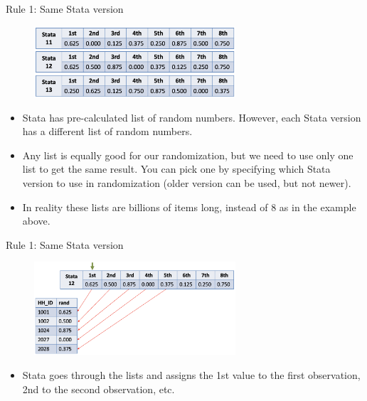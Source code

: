 \documentclass[aspectratio=169]{beamer}
\begin{document}
\begin{frame}[fragile]{Rule 1: Same Stata version}
	
	\begin{figure}
		\centering
		\includegraphics[width=75mm]{img/Randomization4}
	\end{figure}
	
	\begin{itemize}[<default overlay specification>]	
		\item<1>  Stata has pre-calculated list of random numbers. However, each Stata version has a different list of random numbers. 
		\item<1> Any list is equally good for our randomization, but we need to use only one list to get the same result. You can pick one by specifying which Stata version to use in randomization (older version can be used, but not newer). 
		\item<1> In reality these lists are billions of items long, instead of 8 as in the example above. 
	\end{itemize}
	
\end{frame}


\begin{frame}[fragile]{Rule 1: Same Stata version}

\begin{figure}
	\centering
	\includegraphics[width=75mm]{img/Randomization5}
\end{figure}

\begin{itemize}[<default overlay specification>]	
	\item<1>  Stata goes through the lists and assigns the 1st value to the first observation, 2nd to the second observation, etc.
\end{itemize}

\end{frame}
\end{document}
